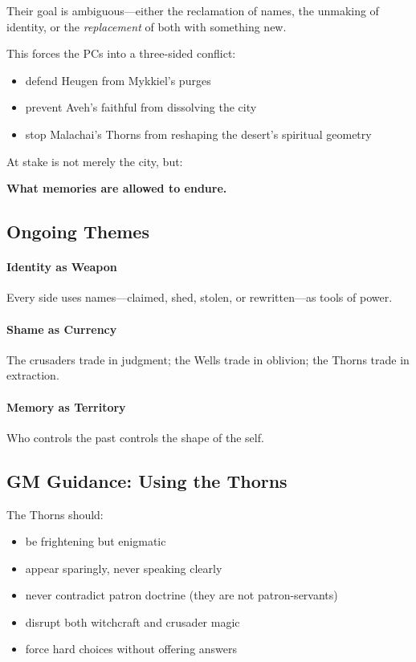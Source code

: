 \documentclass[11pt]{book}
\begin{document}
Their goal is ambiguous---either the reclamation of names, the unmaking of identity, or the
\emph{replacement} of both with something new.

This forces the PCs into a three-sided conflict:
\begin{itemize}
    \item defend Heugen from Mykkiel's purges  
    \item prevent Aveh's faithful from dissolving the city  
    \item stop Malachai's Thorns from reshaping the desert's spiritual geometry  
\end{itemize}

At stake is not merely the city, but:
\begin{center}
\textbf{What memories are allowed to endure.}
\end{center}

\subsection{Ongoing Themes}

\paragraph{Identity as Weapon}  
Every side uses names---claimed, shed, stolen, or rewritten---as tools of power.

\paragraph{Shame as Currency}  
The crusaders trade in judgment; the Wells trade in oblivion; the Thorns trade in extraction.

\paragraph{Memory as Territory}  
Who controls the past controls the shape of the self.

\subsection{GM Guidance: Using the Thorns}

The Thorns should:
\begin{itemize}[leftmargin=*]
    \item be frightening but enigmatic  
    \item appear sparingly, never speaking clearly  
    \item never contradict patron doctrine (they are not patron-servants)  
    \item disrupt both witchcraft and crusader magic  
    \item force hard choices without offering answers  
\end{itemize}
\end{document}
